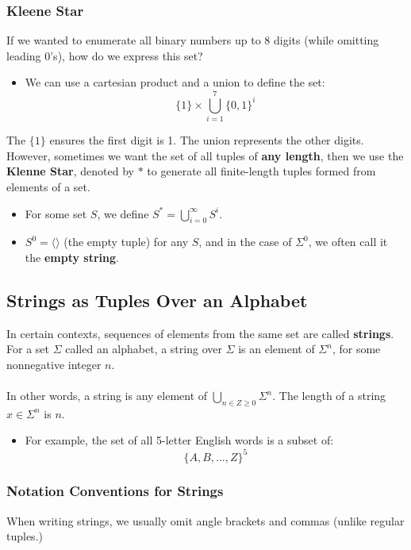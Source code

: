 \documentclass[10pt]{article}
\begin{document}
\subsubsection*{Kleene Star}
If we wanted to enumerate all binary numbers up to 8 digits (while omitting leading 0's), how do we express this set?
\begin{itemize}
	\item We can use a cartesian product and a union to define the set:
	\[\{1\} \times \bigcup_{i = 1}^7 \{0, 1\}^i\]
\end{itemize}
The $\{1\}$ ensures the first digit is 1.  The union represents the other digits.  However, sometimes we want the set of all tuples of \textbf{any length}, then we use the \textbf{Klenne Star}, denoted by $*$ to generate all finite-length tuples formed from elements of a set.
\begin{itemize}
	\item For some set $S$, we define $S^* = \bigcup_{i = 0}^\infty S^i$.
	\item $S^0 = \langle \rangle$ (the empty tuple) for any $S$, and in the case of $\Sigma^0$, we often call it the \textbf{empty string}.
\end{itemize}

\subsection*{Strings as Tuples Over an Alphabet}
In certain contexts, sequences of elements from the same set are called \textbf{strings}.  For a set $\Sigma$ called an alphabet, a string over $\Sigma$ is an element of $\Sigma^n$, for some nonnegative integer $n$.\\\\
In other words, a string is any element of $\bigcup_{n \in Z \geq 0} \Sigma^n$.  The length of a string $x \in \Sigma^n$ is $n$.
\begin{itemize}
	\item For example, the set of all 5-letter English words is a subset of:
	\[\{A, B, \dots, Z\}^5\]
\end{itemize}

\subsubsection*{Notation Conventions for Strings}
When writing strings, we usually omit angle brackets and commas (unlike regular tuples.)
\end{document}
